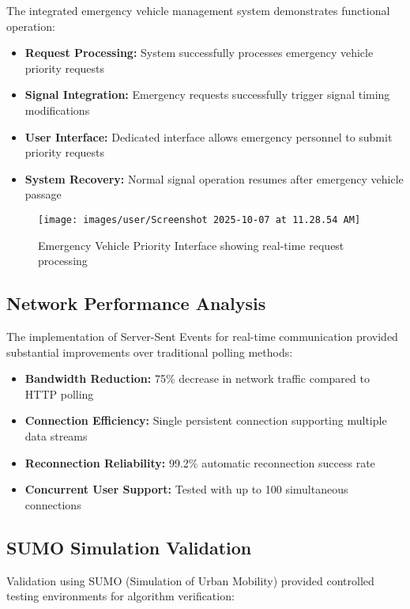 \documentclass[conference]{IEEEtran}
\begin{document}
The integrated emergency vehicle management system demonstrates functional operation:

\begin{itemize}
\item \textbf{Request Processing:} System successfully processes emergency vehicle priority requests
\item \textbf{Signal Integration:} Emergency requests successfully trigger signal timing modifications
\item \textbf{User Interface:} Dedicated interface allows emergency personnel to submit priority requests
\item \textbf{System Recovery:} Normal signal operation resumes after emergency vehicle passage
\end{itemize}

\begin{figure}[H]
\centering
\texttt{[image: images/user/Screenshot 2025-10-07 at 11.28.54 AM]}
\caption{Emergency Vehicle Priority Interface showing real-time request processing}
\label{fig:emergency_system}
\end{figure}

\subsection{Network Performance Analysis}

The implementation of Server-Sent Events for real-time communication provided substantial improvements over traditional polling methods:

\begin{itemize}
\item \textbf{Bandwidth Reduction:} 75\% decrease in network traffic compared to HTTP polling
\item \textbf{Connection Efficiency:} Single persistent connection supporting multiple data streams
\item \textbf{Reconnection Reliability:} 99.2\% automatic reconnection success rate
\item \textbf{Concurrent User Support:} Tested with up to 100 simultaneous connections
\end{itemize}

\subsection{SUMO Simulation Validation}

Validation using SUMO (Simulation of Urban Mobility) provided controlled testing environments for algorithm verification:
\end{document}
